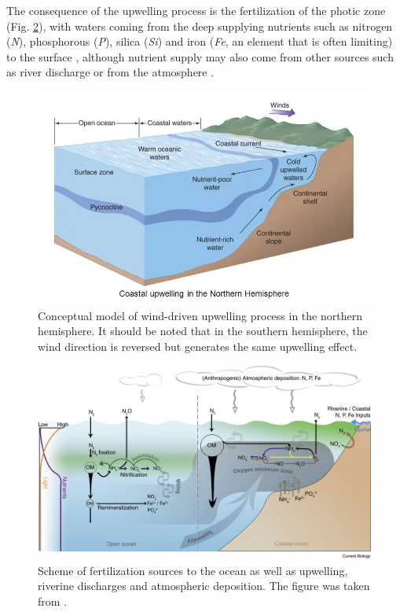 The consequence of the upwelling process is the fertilization of the photic zone (Fig. \ref{Chap1UpwellingFertilization}), with waters coming from the deep supplying nutrients such as nitrogen (\textit{N}), phosphorous (\textit{P}), silica (\textit{Si}) and iron (\textit{Fe}, an element that is often limiting) to the surface \citep{GeidLaro1994,Behr1996,BehrKolb1999,Hutc2002,MoorMils2013,BrisMohr2017}, although nutrient supply may also come from other sources such as river discharge \citep{Shar2017} or from the atmosphere \citep{Powe2015}.\\

\begin{figure}[!]
	\centering
	\includegraphics[width=1.0\textwidth]{figures/Chap1CoastalUpwelling.png}
	\caption{Conceptual model of wind-driven upwelling process in the northern hemisphere. It should be noted that in the southern hemisphere, the wind direction is reversed but generates the same upwelling effect.}
	\label{Chap1CoastalUpwelling}
\end{figure}

\begin{figure}[!]
	\includegraphics[width=1.0\textwidth]{figures/Chap1UpwellingFertilization.jpg}
	\centering
	\caption{Scheme of fertilization sources to the ocean as well as upwelling, riverine discharges and atmospheric deposition. The figure was taken from \cite{BrisMohr2017}.}
	\centering
	\label{Chap1UpwellingFertilization}
\end{figure}

